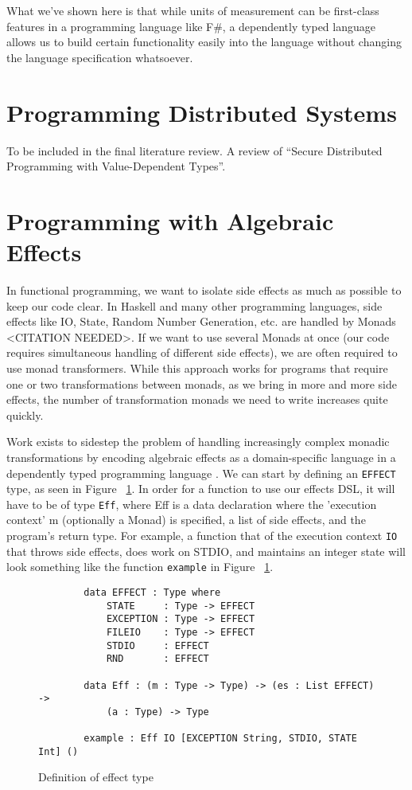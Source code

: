 What we've shown here is that while units of measurement can be first-class
features in a programming language like F\#, a dependently typed language allows
us to build certain functionality easily into the language without changing the
language specification whatsoever. 

\section{Programming Distributed Systems}

To be included in the final literature review. A review of ``Secure Distributed
Programming with Value-Dependent Types''. \cite{fstar_distributed_programming}

\section{Programming with Algebraic Effects}

In functional programming, we want to isolate side effects as much as possible
to keep our code clear. In Haskell and many other programming languages, side
effects like IO, State, Random Number Generation, etc. are handled by Monads
<CITATION NEEDED>. If we want to use several Monads at once (our code requires
simultaneous handling of different side effects), we are often required to use
monad transformers. While this approach works for programs that require one or
two transformations between monads, as we bring in more and more side effects,
the number of transformation monads we need to write increases quite quickly. 

Work exists to sidestep the problem of handling increasingly complex monadic
transformations by encoding algebraic effects as a domain-specific language in a
dependently typed programming language \cite{algebraic}. We can start by
defining an \texttt{EFFECT} type, as seen in Figure ~\ref{effects_def}. In order
for a function to use our effects DSL, it will have to be of type \texttt{Eff},
where Eff is a data declaration where the 'execution context' m (optionally a
Monad) is specified, a list of side effects, and the program's return type. For
example, a function that of the execution context \texttt{IO} that throws side
effects, does work on STDIO, and maintains an integer state will look something
like the function \texttt{example} in Figure ~\ref{effects_def}. 

\begin{figure}[h]
    \caption{Definition of effect type}
    \label{effects_def}
    \begin{lstlisting}
        data EFFECT : Type where
            STATE     : Type -> EFFECT
            EXCEPTION : Type -> EFFECT
            FILEIO    : Type -> EFFECT
            STDIO     : EFFECT
            RND       : EFFECT
        
        data Eff : (m : Type -> Type) -> (es : List EFFECT) -> 
            (a : Type) -> Type
    
        example : Eff IO [EXCEPTION String, STDIO, STATE Int] ()
    \end{lstlisting}
\end{figure}

